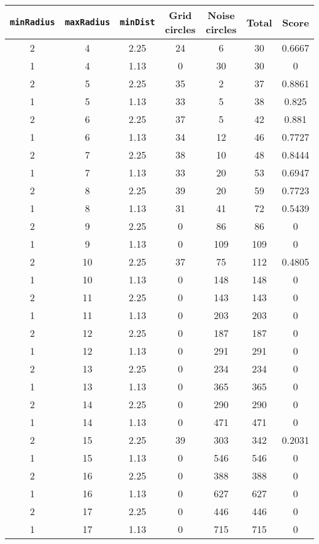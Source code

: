\documentclass[letterpaper, 12pt]{article}
\begin{document}
\begin{longtable}{|c|c|c|c|c|c|c|}
\hline
\textbf{\texttt{minRadius}} & \textbf{\texttt{maxRadius}} & \textbf{\texttt{minDist}} & \textbf{Grid circles} & \textbf{Noise circles} & \textbf{Total} & \textbf{Score} \\
\hline
2 & 4 & 2.25 & 24 & 6 & 30 & 0.6667 \\
\hline
1 & 4 & 1.13 & 0 & 30 & 30 & 0 \\
\hline
2 & 5 & 2.25 & 35 & 2 & 37 & 0.8861 \\
\hline
1 & 5 & 1.13 & 33 & 5 & 38 & 0.825 \\
\hline
2 & 6 & 2.25 & 37 & 5 & 42 & 0.881 \\
\hline
1 & 6 & 1.13 & 34 & 12 & 46 & 0.7727 \\
\hline
2 & 7 & 2.25 & 38 & 10 & 48 & 0.8444 \\
\hline
1 & 7 & 1.13 & 33 & 20 & 53 & 0.6947 \\
\hline
2 & 8 & 2.25 & 39 & 20 & 59 & 0.7723 \\
\hline
1 & 8 & 1.13 & 31 & 41 & 72 & 0.5439 \\
\hline
2 & 9 & 2.25 & 0 & 86 & 86 & 0 \\
\hline
1 & 9 & 1.13 & 0 & 109 & 109 & 0 \\
\hline
2 & 10 & 2.25 & 37 & 75 & 112 & 0.4805 \\
\hline
1 & 10 & 1.13 & 0 & 148 & 148 & 0 \\
\hline
2 & 11 & 2.25 & 0 & 143 & 143 & 0 \\
\hline
1 & 11 & 1.13 & 0 & 203 & 203 & 0 \\
\hline
2 & 12 & 2.25 & 0 & 187 & 187 & 0 \\
\hline
1 & 12 & 1.13 & 0 & 291 & 291 & 0 \\
\hline
2 & 13 & 2.25 & 0 & 234 & 234 & 0 \\
\hline
1 & 13 & 1.13 & 0 & 365 & 365 & 0 \\
\hline
2 & 14 & 2.25 & 0 & 290 & 290 & 0 \\
\hline
1 & 14 & 1.13 & 0 & 471 & 471 & 0 \\
\hline
2 & 15 & 2.25 & 39 & 303 & 342 & 0.2031 \\
\hline
1 & 15 & 1.13 & 0 & 546 & 546 & 0 \\
\hline
2 & 16 & 2.25 & 0 & 388 & 388 & 0 \\
\hline
1 & 16 & 1.13 & 0 & 627 & 627 & 0 \\
\hline
2 & 17 & 2.25 & 0 & 446 & 446 & 0 \\
\hline
1 & 17 & 1.13 & 0 & 715 & 715 & 0 \\

\end{longtable}
\end{document}
